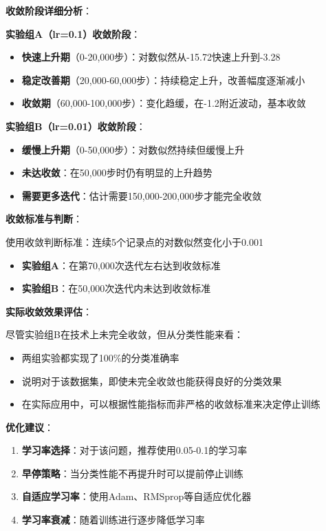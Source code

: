 \documentclass[a4paper]{article}
\begin{document}
\textbf{收敛阶段详细分析}：

\textbf{实验组A（lr=0.1）收敛阶段}：
\begin{itemize}
    \item \textbf{快速上升期}（0-20,000步）：对数似然从-15.72快速上升到-3.28
    \item \textbf{稳定改善期}（20,000-60,000步）：持续稳定上升，改善幅度逐渐减小
    \item \textbf{收敛期}（60,000-100,000步）：变化趋缓，在-1.2附近波动，基本收敛
\end{itemize}

\textbf{实验组B（lr=0.01）收敛阶段}：
\begin{itemize}
    \item \textbf{缓慢上升期}（0-50,000步）：对数似然持续但缓慢上升
    \item \textbf{未达收敛}：在50,000步时仍有明显的上升趋势
    \item \textbf{需要更多迭代}：估计需要150,000-200,000步才能完全收敛
\end{itemize}

\textbf{收敛标准与判断}：

使用收敛判断标准：连续5个记录点的对数似然变化小于0.001

\begin{itemize}
    \item \textbf{实验组A}：在第70,000次迭代左右达到收敛标准
    \item \textbf{实验组B}：在50,000次迭代内未达到收敛标准
\end{itemize}

\textbf{实际收敛效果评估}：

尽管实验组B在技术上未完全收敛，但从分类性能来看：
\begin{itemize}
    \item 两组实验都实现了100\%的分类准确率
    \item 说明对于该数据集，即使未完全收敛也能获得良好的分类效果
    \item 在实际应用中，可以根据性能指标而非严格的收敛标准来决定停止训练
\end{itemize}

\textbf{优化建议}：

\begin{enumerate}
    \item \textbf{学习率选择}：对于该问题，推荐使用0.05-0.1的学习率
    \item \textbf{早停策略}：当分类性能不再提升时可以提前停止训练
    \item \textbf{自适应学习率}：使用Adam、RMSprop等自适应优化器
    \item \textbf{学习率衰减}：随着训练进行逐步降低学习率
\end{enumerate}
\end{document}
